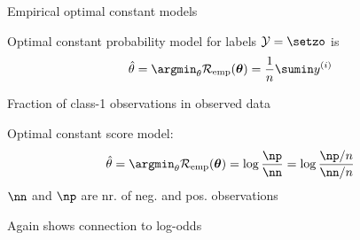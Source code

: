 \documentclass[11pt,compress,t,notes=noshow, xcolor=table]{beamer}
\begin{document}
\begin{framei}[sep=L]{Empirical optimal constant models}

\item Optimal constant probability model for labels $\Yspace = \setzo$ is 
$$\thetah = \argmin_{\theta} \risket = \frac{1}{n} \sumin \yi$$
\item Fraction of class-1 observations in observed data
\item Optimal constant score model:
$$\thetah = \argmin_{\theta} \risket = \log \frac{\np}{\nn} = \log \frac{\np / n}{\nn /n}$$ 
$\nn$ and $\np$ are nr.  of neg. and pos. observations
\item Again shows connection to log-odds 


\end{framei}


    


\end{document}
